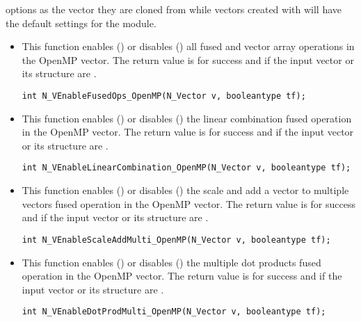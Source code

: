 options as the vector they are cloned from while vectors created with
 will have the default settings for the {\nvecopenmp} module.
\begin{itemize}


\item {}

This function enables () or disables () all fused and
vector array operations in the OpenMP vector. The return value is  for
success and  if the input vector or its  structure are .

\verb|int N_VEnableFusedOps_OpenMP(N_Vector v, booleantype tf);|


\item {}

This function enables () or disables () the linear
combination fused operation in the OpenMP vector. The return value is  for
success and  if the input vector or its  structure are .

\verb|int N_VEnableLinearCombination_OpenMP(N_Vector v, booleantype tf);|


\item {}

This function enables () or disables () the scale and
add a vector to multiple vectors fused operation in the OpenMP vector. The
return value is  for success and  if the input vector or its
 structure are .

\verb|int N_VEnableScaleAddMulti_OpenMP(N_Vector v, booleantype tf);|


\item {}

This function enables () or disables () the multiple
dot products fused operation in the OpenMP vector. The return value is 
for success and  if the input vector or its  structure are
.

\verb|int N_VEnableDotProdMulti_OpenMP(N_Vector v, booleantype tf);|


\end{itemize}
